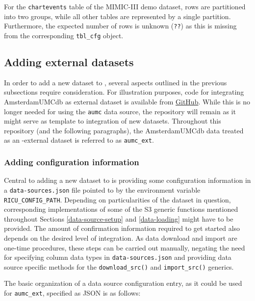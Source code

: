 \documentclass[
  notitle,
  nojss,
  noheadings]{jss}
\begin{document}
For the \texttt{chartevents} table of the MIMIC-III demo dataset, rows
are partitioned into two groups, while all other tables are represented
by a single partition. Furthermore, the expected number of rows is
unknown (\texttt{??}) as this is missing from the corresponding
\texttt{tbl\_cfg} object.

\hypertarget{adding-external-datasets}{%
\subsection{Adding external datasets}\label{adding-external-datasets}}

In order to add a new dataset to , several aspects outlined in
the previous subsections require consideration. For illustration
purposes, code for integrating AmsterdamUMCdb as external dataset is
available from \href{https://github.com/eth-mds/aumc}{GitHub}. While
this is no longer needed for using the \texttt{aumc} data source, the
repository will remain as it might serve as template to integration of
new datasets. Throughout this repository (and the following paragraphs),
the AmsterdamUMCdb data treated as an -external dataset is
referred to as \texttt{aumc\_ext}.

\hypertarget{adding-configuration-information}{%
\subsubsection{Adding configuration
information}\label{adding-configuration-information}}

Central to adding a new dataset to  is providing some
configuration information in a \texttt{data-sources.json} file pointed
to by the environment variable \texttt{RICU\_CONFIG\_PATH}. Depending on
particularities of the dataset in question, corresponding
implementations of some of the S3 generic functions mentioned throughout
Sections \ref{data-source-setup} and \ref{data-loading} might have to be
provided. The amount of confirmation information required to get started
also depends on the desired level of integration. As data download and
import are one-time procedures, these steps can be carried out manually,
negating the need for specifying column data types in
\texttt{data-sources.json} and providing data source specific methods
for the \texttt{download\_src()} and \texttt{import\_src()} generics.

The basic organization of a data source configuration entry, as it could
be used for \texttt{aumc\_ext}, specified as JSON is as follows:
\end{document}
